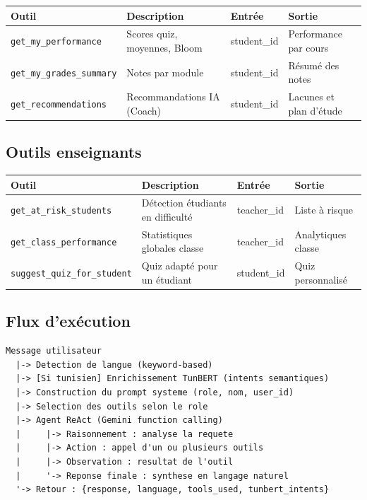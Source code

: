 \documentclass[12pt,a4paper]{article}
\begin{document}
\begin{longtable}{@{}p{4cm}p{6cm}p{2cm}p{3cm}@{}}
\toprule
\textbf{Outil} & \textbf{Description} & \textbf{Entrée} & \textbf{Sortie} \\
\midrule
\endhead
\texttt{get\_my\_performance} & Scores quiz, moyennes, Bloom & student\_id & Performance par cours \\
\texttt{get\_my\_grades\_summary} & Notes par module & student\_id & Résumé des notes \\
\texttt{get\_recommendations} & Recommandations IA (Coach) & student\_id & Lacunes et plan d'étude \\
\bottomrule
\end{longtable}

\subsection{Outils enseignants}

\begin{longtable}{@{}p{4.5cm}p{5.5cm}p{2cm}p{3cm}@{}}
\toprule
\textbf{Outil} & \textbf{Description} & \textbf{Entrée} & \textbf{Sortie} \\
\midrule
\endhead
\texttt{get\_at\_risk\_students} & Détection étudiants en difficulté & teacher\_id & Liste à risque \\
\texttt{get\_class\_performance} & Statistiques globales classe & teacher\_id & Analytiques classe \\
\texttt{suggest\_quiz\_for\_student} & Quiz adapté pour un étudiant & student\_id & Quiz personnalisé \\
\bottomrule
\end{longtable}

\subsection{Flux d'exécution}

\begin{lstlisting}[language={},caption={Pipeline de l'Assistant Agent}]
Message utilisateur
  |-> Detection de langue (keyword-based)
  |-> [Si tunisien] Enrichissement TunBERT (intents semantiques)
  |-> Construction du prompt systeme (role, nom, user_id)
  |-> Selection des outils selon le role
  |-> Agent ReAct (Gemini function calling)
  |     |-> Raisonnement : analyse la requete
  |     |-> Action : appel d'un ou plusieurs outils
  |     |-> Observation : resultat de l'outil
  |     '-> Reponse finale : synthese en langage naturel
  '-> Retour : {response, language, tools_used, tunbert_intents}
\end{lstlisting}
\end{document}

